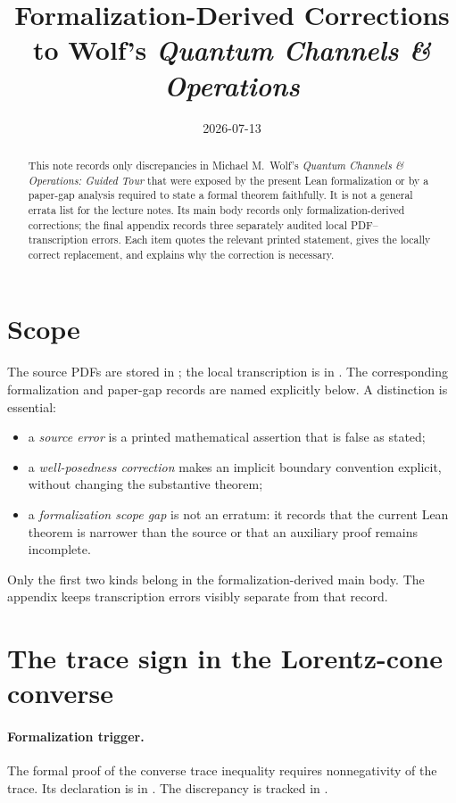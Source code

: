 \documentclass{article}
\title{Formalization-Derived Corrections to Wolf's \emph{Quantum Channels \& Operations}}
\author{}
\date{2026-07-13}
\begin{document}
\sloppy
\maketitle
{}

\begin{abstract}
This note records only discrepancies in Michael M.~Wolf's \emph{Quantum
Channels \& Operations: Guided Tour} that were exposed by the present Lean
formalization or by a paper-gap analysis required to state a formal theorem
faithfully. It is not a general errata list for the lecture notes. Its main
body records only formalization-derived corrections; the final appendix records
three separately audited local PDF--transcription errors. Each item quotes the
relevant printed statement, gives the locally correct replacement, and explains
why the correction is necessary.
\end{abstract}

\section{Scope}

The source PDFs are stored in ; the local
transcription is in . The corresponding
formalization and paper-gap records are named explicitly below. A distinction
is essential:
\begin{itemize}
  \item a \emph{source error} is a printed mathematical assertion that is false
    as stated;
  \item a \emph{well-posedness correction} makes an implicit boundary convention
    explicit, without changing the substantive theorem;
  \item a \emph{formalization scope gap} is not an erratum: it records that the
    current Lean theorem is narrower than the source or that an auxiliary proof
    remains incomplete.
\end{itemize}

Only the first two kinds belong in the formalization-derived main body. The
appendix keeps transcription errors visibly separate from that record.

\section{The trace sign in the Lorentz-cone converse}
\label{sec:lorentz}

\paragraph{Formalization trigger.}
The formal proof of the converse trace inequality requires nonnegativity of the
trace. Its declaration is
in . The discrepancy is
tracked in .
\end{document}
